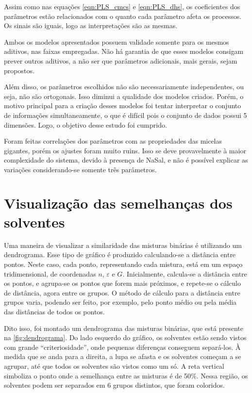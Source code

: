 		Assim como nas equações \ref{eqn:PLS_cmcs} e \ref{eqn:PLS_dhs}, os coeficientes dos parâmetros estão relacionados com o quanto cada parâmetro afeta os processos. Os sinais são iguais, logo as interpretações são as mesmas.
		
		Ambos os modelos apresentados possuem validade somente para os mesmos aditivos, nas faixas empregadas. Não há garantia de que esses modelos consigam prever outros aditivos, a não ser que parâmetros adicionais, mais gerais, sejam propostos.
		
		Além disso, os parâmetros escolhidos não são necessariamente independentes, ou seja, não são ortogonais. Isso diminui a qualidade dos modelos criados. Porém, o motivo principal para a criação desses modelos foi tentar interpretar o conjunto de informações simultaneamente, o que é difícil pois o conjunto de dados possui 5 dimensões. Logo, o objetivo desse estudo foi cumprido.
		
		Foram feitas correlações dos parâmetros com as propriedades das micelas gigantes, porém os ajustes foram muito ruins. Isso se deve provavelmente à maior complexidade do sistema, devido à presença de NaSal, e não é possível explicar as variações considerando-se somente três parâmetros.
		
		
		\FloatBarrier
		
		\section{Visualização das semelhanças dos solventes}
		
		Uma maneira de visualizar a similaridade das misturas binárias é utilizando um dendrograma. Esse tipo de gráfico é produzido calculando-se a distância entre pontos. Neste caso, cada ponto, representando cada mistura, está em um espaço tridimensional, de coordenadas \(n\), \(\varepsilon\) e \(G\). Inicialmente, calcula-se a distância entre os pontos, e agrupa-se os pontos que forem mais próximos, e repete-se o cálculo de distância, agora entre os grupos. O método de cálculo para a distância entre grupos varia, podendo ser feito, por exemplo, pelo ponto médio ou pela média das distâncias de todos os pontos. %
		
		Dito isso, foi montado um dendrograma das misturas binárias, que está presente na \autoref{fig:dendrograma}. Do lado esquerdo do gráfico, os solventes estão sendo vistos com grande ``criteriosidade'', onde pequenas diferenças conseguem separá-los. À medida que se anda para a direita, a lupa se afasta e os solventes começam a se agrupar, até que todos os solventes são vistos como um só. A reta vertical simboliza o ponto onde a semelhança entre as misturas é de 50\%. Nessa região, os solventes podem ser separados em 6 grupos distintos, que foram coloridos.
		
